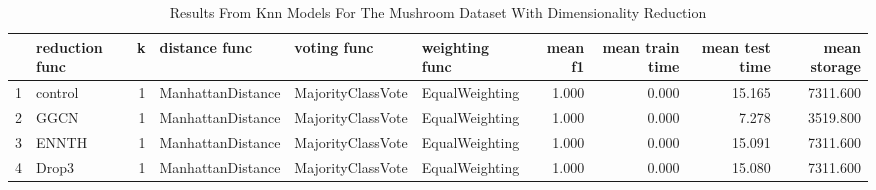\begin{table}
\centering
\caption{Results From Knn Models For The Mushroom Dataset With Dimensionality Reduction}
\label{tab:knn_reduction_results_mushroom}
\begin{tabular}{rlrlllrrrr}
\toprule
 & reduction func & k & distance func & voting func & weighting func & mean f1 & mean train time & mean test time & mean storage \\
\midrule
1 & control & 1 & ManhattanDistance & MajorityClassVote & EqualWeighting & 1.000 & 0.000 & 15.165 & 7311.600 \\
2 & GGCN & 1 & ManhattanDistance & MajorityClassVote & EqualWeighting & 1.000 & 0.000 & 7.278 & 3519.800 \\
3 & ENNTH & 1 & ManhattanDistance & MajorityClassVote & EqualWeighting & 1.000 & 0.000 & 15.091 & 7311.600 \\
4 & Drop3 & 1 & ManhattanDistance & MajorityClassVote & EqualWeighting & 1.000 & 0.000 & 15.080 & 7311.600 \\
\bottomrule
\end{tabular}
\end{table}
